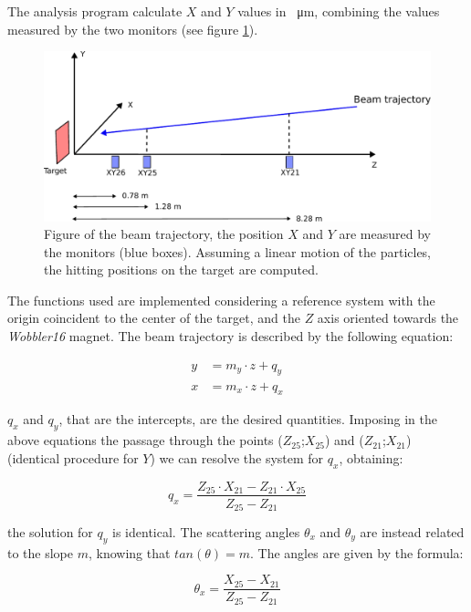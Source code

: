 The analysis program calculate $X$ and $Y$ values in \SI{}{\micro \meter}, combining the values measured by the two monitors (see figure \ref{fig:BeamTraje}).

\begin{figure}[!hbtp]
\centering
\includegraphics[scale=0.75]{Appendix/scheme.pdf}
\caption{Figure of the beam trajectory, the position $X$ and $Y$ are measured by the monitors (blue boxes). Assuming a linear motion of the particles, the hitting positions on the target are computed.}
\label{fig:BeamTraje}
\end{figure}

The functions used are implemented considering a reference system with the origin coincident to the center of the target, and the $Z$ axis oriented towards the \textit{Wobbler16} magnet. The beam trajectory is described by the following equation:

\begin{align*}
y &= m_{y} \cdot z + q_{y} \\
x &= m_{x} \cdot z + q_{x}
\end{align*}

$q_{x}$ and $q_{y}$, that are the intercepts, are the desired quantities.
Imposing in the above equations the passage through the points ($Z_{25}$;$X_{25}$) and ($Z_{21}$;$X_{21}$) (identical procedure for $Y$) we can resolve the system for $q_{x}$, obtaining:

\begin{equation}
q_{x} = \dfrac{Z_{25} \cdot X_{21} - Z_{21} \cdot X_{25}}{Z_{25} - Z_{21}}
\end{equation} 

the solution for $q_{y}$ is identical. The scattering angles $\theta_{x}$ and $\theta_{y}$ are instead related to the slope $m$, knowing that $tan(\theta) = m$. The angles are given by the formula:

\begin{equation}
\theta_{x} = \dfrac{X_{25} - X_{21}}{Z_{25} - Z_{21}}
\end{equation}


